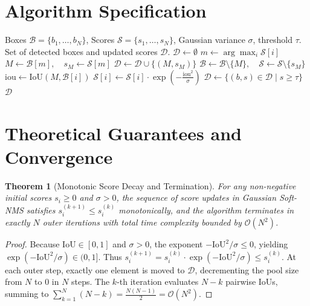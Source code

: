 \documentclass[11pt,a4paper]{article}
\newtheorem{theorem}{Theorem}
\theoremstyle{definition}
\begin{document}
\section{Algorithm Specification}

\begin{algorithm}[H]
\caption{Gaussian Soft-NMS Algorithm}
\label{alg:soft_nms}
\begin{algorithmic}[1]
\Require Boxes $\mathcal{B} = \{b_1, \dots, b_N\}$, Scores $\mathcal{S} = \{s_1, \dots, s_N\}$, Gaussian variance $\sigma$, threshold $\tau$.
\Ensure Set of detected boxes and updated scores $\mathcal{D}$.
\State $\mathcal{D} \gets \emptyset$
    \State $m \gets \arg\max_{i} \mathcal{S}[i]$
    \State $M \gets \mathcal{B}[m], \quad s_M \gets \mathcal{S}[m]$
    \State $\mathcal{D} \gets \mathcal{D} \cup \{(M, s_M)\}$
    \State $\mathcal{B} \gets \mathcal{B} \setminus \{M\}, \quad \mathcal{S} \gets \mathcal{S} \setminus \{s_M\}$
        \State $\text{iou} \gets \text{IoU}(M, \mathcal{B}[i])$
        \State $\mathcal{S}[i] \gets \mathcal{S}[i] \cdot \exp\left( - \frac{\text{iou}^2}{\sigma} \right)$
    \EndFor
\EndWhile
\State $\mathcal{D} \gets \{(b, s) \in \mathcal{D} \mid s \ge \tau\}$
\State \Return $\mathcal{D}$
\end{algorithmic}
\end{algorithm}

\section{Theoretical Guarantees and Convergence}

\begin{theorem}[Monotonic Score Decay and Termination]
\label{thm:nms_termination}
For any non-negative initial scores $s_i \ge 0$ and $\sigma > 0$, the sequence of score updates in Gaussian Soft-NMS satisfies $s_i^{(k+1)} \le s_i^{(k)}$ monotonically, and the algorithm terminates in exactly $N$ outer iterations with total time complexity bounded by $\mathcal{O}(N^2)$.
\end{theorem}

\begin{proof}
Because $\text{IoU} \in [0, 1]$ and $\sigma > 0$, the exponent $-\text{IoU}^2 / \sigma \le 0$, yielding $\exp(-\text{IoU}^2 / \sigma) \in (0, 1]$. Thus $s_i^{(k+1)} = s_i^{(k)} \cdot \exp(-\text{IoU}^2 / \sigma) \le s_i^{(k)}$. At each outer step, exactly one element is moved to $\mathcal{D}$, decrementing the pool size from $N$ to $0$ in $N$ steps. The $k$-th iteration evaluates $N - k$ pairwise IoUs, summing to $\sum_{k=1}^N (N - k) = \frac{N(N-1)}{2} = \mathcal{O}(N^2)$.
\end{proof}
\end{document}
